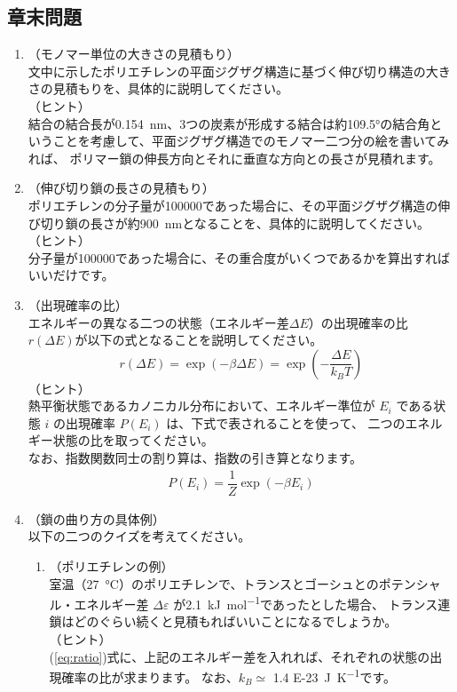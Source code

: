 \documentclass[a4paper,11pt]{jlreq}
\begin{document}
\subsection{章末問題}
	\begin{enumerate}
		\item
		\label{it:2-1}
		（モノマー単位の大きさの見積もり）\\
		文中に示したポリエチレンの平面ジグザグ構造に基づく伸び切り構造の大きさの見積もりを、具体的に説明してください。\\
		（ヒント）\\
		結合の結合長が\qty{0.154}{nm}、3つの炭素が形成する結合は約\ang{109.5}の結合角ということを考慮して、平面ジグザグ構造でのモノマー二つ分の絵を書いてみれば、
		ポリマー鎖の伸長方向とそれに垂直な方向との長さが見積れます。

		\item
		\label{it:2-2}
		（伸び切り鎖の長さの見積もり）\\
		ポリエチレンの分子量が\num{100000}であった場合に、その平面ジグザグ構造の伸び切り鎖の長さが約\qty{900}{nm}となることを、具体的に説明してください。\\
		（ヒント）\\
		分子量が\num{100000}であった場合に、その重合度がいくつであるかを算出すればいいだけです。

		\item
		\label{it:2-3}
		（出現確率の比）\\
		エネルギーの異なる二つの状態（エネルギー差$\Delta E$）の出現確率の比$r(\Delta E)$が以下の式となることを説明してください。
		\begin{equation*}
		r(\Delta E) = \exp(-\beta \Delta E)=\exp \left( -\dfrac{\Delta E}{k_B T} \right)
		\end{equation*}
		（ヒント）\\
		熱平衡状態であるカノニカル分布において、エネルギー準位が $E_i$ である状態 $i$ の出現確率 $P(E_i)$ は、下式で表されることを使って、
		二つのエネルギー状態の比を取ってください。\\
		なお、指数関数同士の割り算は、指数の引き算となります。
		\begin{align*}
		P(E_i) = \dfrac{1}{Z} \exp(-\beta E_i)
		\end{align*}

		\item
		（鎖の曲り方の具体例）\\
		以下の二つのクイズを考えてください。

		\begin{enumerate}
			\item
			\label{it:2-4}
			（ポリエチレンの例）\\
			室温（\qty{27}{\degreeCelsius}）のポリエチレンで、トランスとゴーシュとのポテンシャル・エネルギー差 $\Delta \varepsilon$ が\qty{2.1}{kJ mol^{-1}}であったとした場合、
			トランス連鎖はどのぐらい続くと見積もればいいことになるでしょうか。\\
			（ヒント）\\
			(\ref{eq:ratio})式に、上記のエネルギー差を入れれば、それぞれの状態の出現確率の比が求まります。
			なお、$k_B \simeq$ \qty{1.4 E-23}{J K^{-1}}です。 


\end{enumerate}
\end{enumerate}
\end{document}

